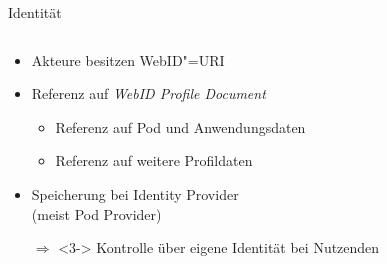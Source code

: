 \begin{frame}{Identität}
    \begin{columns}
        \begin{column}{0.55\textwidth}
            \begin{itemize}
                \item Akteure besitzen WebID"=URI~\cite{sambraSolidPlatformDecentralized2016}
                
                \item Referenz auf \emph{WebID Profile Document}~\cite{sambraSolidPlatformDecentralized2016,solidcommunitygroupSolidemblemsvg2019}
                
                \begin{itemize}
                    \item<2-> Referenz auf Pod und Anwendungsdaten~\cite{solidcommunitygroupSolidWebIDProfile2024}
                    \item<2-> Referenz auf weitere Profildaten~\cite{solidcommunitygroupSolidWebIDProfile2024}
                \end{itemize}

                
                \item<3-> Speicherung bei Identity Provider\\
                    (meist Pod Provider)~\cite{sambraSolidPlatformDecentralized2016}
                \item[$\Rightarrow$]<3-> Kontrolle über eigene Identität bei Nutzenden~\cite{sambraSolidPlatformDecentralized2016}
            \end{itemize}
        \end{column}


\end{columns}
\end{frame}
